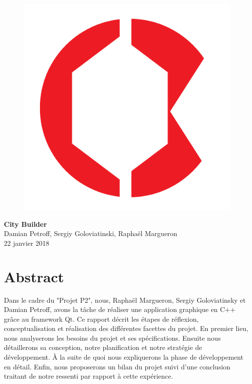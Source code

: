 \documentclass[a4paper,10pt,openany,oneside]{report}
\begin{document}
\vspace*{1cm}
\begin{figure}
\centering
\includegraphics[scale=0.3]{img/iconCB.png}
\end{figure}
\vspace*{6cm}
\begin{center}
\textbf{\Huge City Builder} \\[1cm]
{\Large Damian Petroff, Sergiy Goloviatinski, Raphaël Margueron}
\\[4cm]
22 janvier 2018
\end{center}


\thispagestyle{empty}
\pagebreak
\thispagestyle{empty}
\chapter*{Abstract}
\thispagestyle{empty}
Dans le cadre du "Projet P2", nous, Raphaël Margueron, Sergiy Goloviatinsky et Damian Petroff, avons la tâche de réaliser une application graphique en C++ grâce au framework Qt. 
Ce rapport décrit les étapes de réflexion, conceptualisation et réalisation des différentes facettes du projet. En premier lieu, nous analyserons les besoins du projet et ses spécifications. Ensuite nous détaillerons sa conception, notre planification et notre stratégie de développement. À la suite de quoi nous expliquerons la phase de développement en détail. Enfin, nous proposerons un bilan du projet suivi d'une conclusion traitant de notre ressenti par rapport à cette expérience.
\pagebreak
\end{document}
